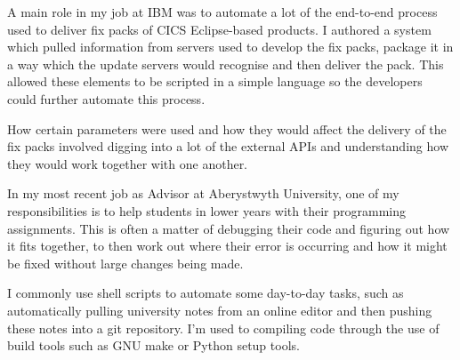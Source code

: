 \documentclass[10pt,stdletter,dateno,sigleft]{newlfm} %
\begin{document}
\begin{newlfm}
A main role in my job at IBM was to automate a lot of the end-to-end process 
used to deliver fix packs of CICS Eclipse-based products. I authored a system which pulled
information from servers used to develop the fix packs, package it in a way 
which the update servers would recognise and then deliver the pack.
This allowed these elements to be scripted in a simple language so
the developers could further automate this process.

How certain parameters were used and how they would affect the delivery of the fix
packs involved digging into a lot of the external APIs and understanding 
how they would work together with one another.

In my most recent job as Advisor at Aberystwyth University, one of my 
responsibilities is to help students in lower years with their programming 
assignments. This is often a matter of debugging their code and 
figuring out how it fits together, to then work out where their error is
occurring and how it might be fixed without large changes being made.

I commonly use shell scripts to automate some day-to-day tasks, such as 
automatically pulling university notes from an
online editor and then pushing these notes into a git repository. I'm
used to compiling code through the use of build tools such as GNU make or 
Python setup tools. 







\end{newlfm}
\end{document}
